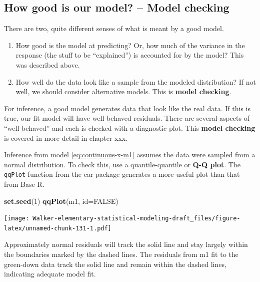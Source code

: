 \documentclass[]{book}
\newenvironment{Shaded}{\begin{snugshade}}{\end{snugshade}}
\newcommand{\DataTypeTok}[1]{\textcolor[rgb]{0.13,0.29,0.53}{#1}}
\newcommand{\DecValTok}[1]{\textcolor[rgb]{0.00,0.00,0.81}{#1}}
\newcommand{\KeywordTok}[1]{\textcolor[rgb]{0.13,0.29,0.53}{\textbf{#1}}}
\newcommand{\NormalTok}[1]{#1}
\newcommand{\OtherTok}[1]{\textcolor[rgb]{0.56,0.35,0.01}{#1}}
\providecommand{\tightlist}{%
  \setlength{\itemsep}{0pt}\setlength{\parskip}{0pt}}
\begin{document}
\hypertarget{how-good-is-our-model-model-checking}{%
\subsection{How good is our model? -- Model checking}\label{how-good-is-our-model-model-checking}}

There are two, quite different senses of what is meant by a good model.

\begin{enumerate}
\def\labelenumi{\arabic{enumi}.}
\tightlist
\item
  How good is the model at predicting? Or, how much of the variance in the response (the stuff to be ``explained'') is accounted for by the model? This was described above.
\item
  How well do the data look like a sample from the modeled distribution? If not well, we should consider alternative models. This is \textbf{model checking}.
\end{enumerate}

For inference, a good model generates data that look like the real data. If this is true, our fit model will have well-behaved residuals. There are several aspects of ``well-behaved'' and each is checked with a diagnostic plot. This \textbf{model checking} is covered in more detail in chapter xxx.

Inference from model \eqref{eq:continuous-x-m1} assumes the data were sampled from a normal distribution. To check this, use a quantile-quantile or \textbf{Q-Q plot}. The \texttt{qqPlot} function from the car package generates a more useful plot than that from Base R.

\begin{Shaded}
\begin{Highlighting}[]
\KeywordTok{set.seed}\NormalTok{(}\DecValTok{1}\NormalTok{)}
\KeywordTok{qqPlot}\NormalTok{(m1, }\DataTypeTok{id=}\OtherTok{FALSE}\NormalTok{)}
\end{Highlighting}
\end{Shaded}

\texttt{[image: Walker-elementary-statistical-modeling-draft\_files/figure-latex/unnamed-chunk-131-1.pdf]}

Approximately normal residuals will track the solid line and stay largely within the boundaries marked by the dashed lines. The residuals from m1 fit to the green-down data track the solid line and remain within the dashed lines, indicating adequate model fit.
\end{document}
